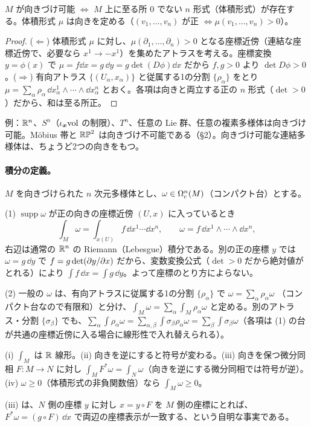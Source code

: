 \begin{prop}\label{B:prop:orient}\tP
$M$ が向きづけ可能 $\iff$ $M$ 上に至る所 $0$ でない $n$ 形式（体積形式）が存在する。体積形式 $\mu$ は向きを定める（$(v_1,\dots,v_n)$ が正 $\iff\mu(v_1,\dots,v_n)>0$）。
\end{prop}
\begin{proof}
($\Leftarrow$) 体積形式 $\mu$ に対し、$\mu(\partial_1,\dots,\partial_n)>0$ となる座標近傍（連結な座標近傍で、必要なら $x^1\to-x^1$）を集めたアトラスを考える。座標変換 $y=\phi(x)$ で $\mu=f\dd x=g\,\dd y=g\det(D\phi)\dd x$ だから $f,g>0$ より $\det D\phi>0$。($\Rightarrow$) 有向アトラス $\{(U_\alpha,x_\alpha)\}$ と従属する1の分割 $\{\rho_\alpha\}$ をとり $\mu=\sum_\alpha\rho_\alpha\,\dd x_\alpha^1\wedge\cdots\wedge\dd x_\alpha^n$ とおく。各項は向きと両立する正の $n$ 形式（$\det>0$）だから、和は至る所正。
\end{proof}
例：$\mathbb R^n$、$S^n$（$\iota_{\boldsymbol x}\mathrm{vol}$ の制限）、$T^n$、任意の Lie 群、任意の複素多様体は向きづけ可能。Möbius 帯と $\mathbb{RP}^{2}$ は向きづけ不可能である（§2）。向きづけ可能な連結多様体は、ちょうど2つの向きをもつ。

\paragraph{積分の定義。}$M$ を向きづけられた $n$ 次元多様体とし、$\omega\in\Omega^n_c(M)$（コンパクト台）とする。

(1) $\operatorname{supp}\omega$ が正の向きの座標近傍 $(U,x)$ に入っているとき
\[
\int_M\omega=\int_{x(U)}f\,\dd x^1\cdots\dd x^n,\qquad\omega=f\,\dd x^1\wedge\cdots\wedge\dd x^n ,
\]
右辺は通常の $\mathbb R^n$ の Riemann（Lebesgue）積分である。別の正の座標 $y$ では $\omega=g\,\dd y$ で $f=g\det(\partial y/\partial x)$ だから、変数変換公式（$\det>0$ だから絶対値がとれる）により $\int f\,\dd x=\int g\,\dd y$。よって座標のとり方によらない。

(2) 一般の $\omega$ は、有向アトラスに従属する1の分割 $\{\rho_\alpha\}$ で $\omega=\sum_\alpha\rho_\alpha\omega$ （コンパクト台なので有限和）と分け、$\int_M\omega=\sum_\alpha\int_M\rho_\alpha\omega$ と定める。別のアトラス・分割 $\{\sigma_\beta\}$ でも、$\sum_{\alpha}\int\rho_\alpha\omega=\sum_{\alpha,\beta}\int\sigma_\beta\rho_\alpha\omega=\sum_\beta\int\sigma_\beta\omega$（各項は (1) の台が共通の座標近傍に入る場合に線形性で入れ替えられる）。

\begin{prop}[積分の性質]\label{B:prop:intprop}\tP
(i) $\int_M$ は $\mathbb R$ 線形。(ii) 向きを逆にすると符号が変わる。(iii) 向きを保つ微分同相 $F:M\to N$ に対し $\int_MF^*\omega=\int_N\omega$（向きを逆にする微分同相では符号が逆）。(iv) $\omega\ge0$（体積形式の非負関数倍）なら $\int_M\omega\ge0$。
\end{prop}
(iii) は、$N$ 側の座標 $y$ に対し $x=y\circ F$ を $M$ 側の座標にとれば、$F^*\omega=(g\circ F)\,\dd x$ で両辺の座標表示が一致する、という自明な事実である。

